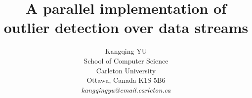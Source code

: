 \documentclass[11pt]{article}       %
\begin{document}


\title{A parallel implementation of outlier detection over data streams}


\author{
Kangqing YU\\
School of Computer Science\\
Carleton University\\
Ottawa, Canada K1S 5B6\\
{\em kangqingyu@cmail.carleton.ca}
} %

\maketitle
\end{document}
